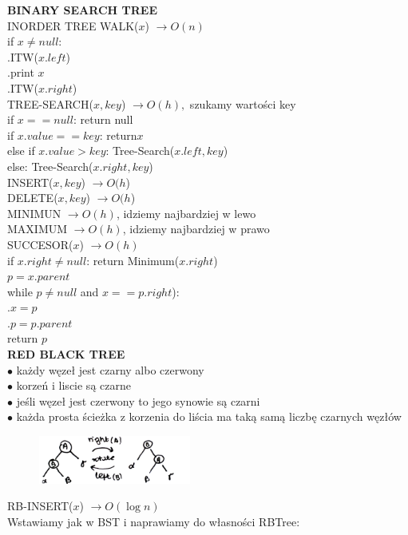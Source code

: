\documentclass[8pt,a3paper]{article}
\begin{document}
\begin{multicols*}{3}
	\textbf{BINARY SEARCH TREE}\\
	INORDER TREE WALK($x$) $\to O(n)$ \\
	if $x \neq null$: \\
	.\quad ITW($x.left$) \\
	.\quad print $x$ \\
	.\quad ITW($x.right$) \\
	TREE-SEARCH($x,key$) $\to O(h),$ szukamy wartości key \\
	if $x==null$: return null \\
	if $x.value == key$: return$ x $\\
	else if $x.value > key$: \quad Tree-Search($x.left, key$) \\
	else: \quad Tree-Search($x.right, key$) \\
	INSERT($x,key$) $\to O(h$)\\
	DELETE($x,key$) $\to O(h$) \\
	MINIMUN $\to O(h)$, idziemy najbardziej w lewo\\
	MAXIMUM $\to O(h)$, idziemy najbardziej w prawo\\
	SUCCESOR($x$) $\to O(h)$ \\
	if $x.right \neq null$: return Minimum($x.right$) \\
	$p = x.parent$ \\
	while $p \neq null$ and $x==p.right$): \\
	.\quad $x=p$ \\
	.\quad $p=p.parent$ \\
	return $p$ \\
	\textbf{RED BLACK TREE} \\
	$\bullet$ każdy węzeł jest czarny albo {\color{BrickRed}czerwony} \\
	$\bullet$ korzeń i liscie są czarne \\
	$\bullet$ jeśli węzeł jest {\color{BrickRed}czerwony} to jego synowie są czarni \\
	$\bullet$ każda prosta ścieżka z korzenia do liścia ma taką samą liczbę czarnych węzłów \\
	\vspace{-0.8cm}
	 \begin{figure}[H]
		 	\centering
		 	\includegraphics[width=5cm]{rotate.PNG}
	 \end{figure}
	 \vspace{-0.6cm}
	RB-INSERT($x$) $\to O(\log n)$ \\
	Wstawiamy jak w BST i naprawiamy do własności RBTree:
	\vspace{-0.5cm}
	 \begin{figure}[H]
		 	

\end{figure}
\end{multicols*}
\end{document}
